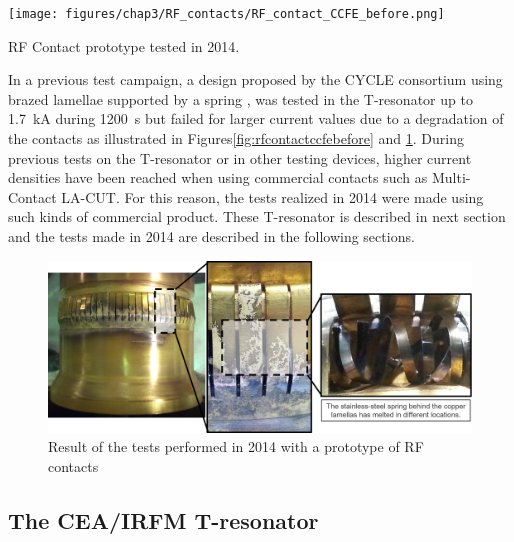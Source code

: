 {\begin{marginfigure}
	\centering
	\texttt{[image: figures/chap3/RF\_contacts/RF\_contact\_CCFE\_before.png]}
	\caption{RF Contact prototype tested in 2014.}
	\label{fig:rfcontactccfebefore}
\end{marginfigure}

In a previous test campaign, a design proposed by the CYCLE consortium using brazed lamellae supported by a spring \cite{argouarch2014}, was tested in the T-resonator up to 1.7~kA during 1200~s but failed for larger current values due to a degradation of the contacts as illustrated in Figures\ref{fig:rfcontactccfebefore} and \ref{fig:rfcontactccfe}\cite{hillairet2015-1}. During previous tests on the T-resonator or in other testing devices, higher current densities have been reached when using commercial contacts such as Multi-Contact LA-CUT\cite{argouarch2013}. For this reason, the tests realized in 2014 were made using such kinds of commercial product. These T-resonator is described in next section and the tests made in 2014 are described in the following sections.

\begin{figure}[h]
	\centering
	\includegraphics[width=1.0\linewidth]{figures/chap3/RF_contacts/RF_contact_CCFE}
	\caption{Result of the tests performed in 2014 with a prototype of RF contacts}
	\label{fig:rfcontactccfe}
\end{figure}


\subsection{The CEA/IRFM T-resonator}

}
